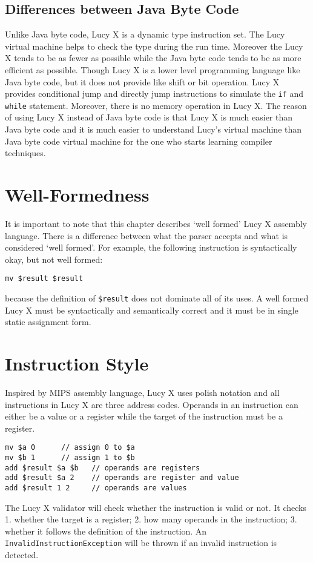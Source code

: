 \subsection{Differences between Java Byte Code}
Unlike Java byte code, Lucy X is a dynamic type instruction set. The Lucy virtual machine helps to check the type during the run time. Moreover the Lucy X tends to be as fewer as possible while the Java byte code tends to be as more efficient as possible. Though Lucy X is a lower level programming language like Java byte code, but it does not provide like shift or bit operation. Lucy X provides conditional jump and directly jump instructions to simulate the \texttt{if} and \texttt{while} statement. Moreover, there is no memory operation in Lucy X. The reason of using Lucy X instead of Java byte code is that Lucy X is much easier than Java byte code and it is much easier to understand Lucy's virtual machine than Java byte code virtual machine for the one who starts learning compiler techniques.


\section{Well-Formedness}
It is important to note that this chapter describes ‘well formed’ Lucy X assembly language. There is a difference between what the parser accepts and what is considered ‘well formed’. For example, the following instruction is syntactically okay, but not well formed:
\begin{lstlisting}[language=LucyX]
mv $result $result
\end{lstlisting}
because the definition of \texttt{\$result} does not dominate all of its uses. A well formed Lucy X must be syntactically and semantically correct and it must be in single static assignment form.


\section{Instruction Style}
Inspired by MIPS assembly language, Lucy X uses polish notation and all instructions in Lucy X are three address codes. Operands in an instruction can either be a value or a register while the target of the instruction must be a register.
\begin{lstlisting}[language=LucyX]
mv $a 0      // assign 0 to $a
mv $b 1      // assign 1 to $b
add $result $a $b   // operands are registers
add $result $a 2    // operands are register and value
add $result 1 2     // operands are values
\end{lstlisting}
The Lucy X validator will check whether the instruction is valid or not. It checks 1. whether the target is a register; 2. how many operands in the instruction; 3. whether it follows the definition of the instruction. An \texttt{InvalidInstructionException} will be thrown if an invalid instruction is detected.

